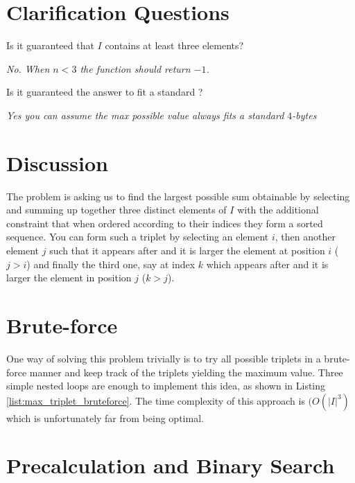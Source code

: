 \section{Clarification Questions}

\begin{QandA}
	\item  Is it guaranteed that $I$ contains at least three elements?
	\begin{answered}
		\textit{No. When $n < 3$ the function should return $-1$.}
	\end{answered}
	\item  Is it guaranteed the answer to fit a standard ?
	\begin{answered}
		\textit{Yes you can assume the max possible value always fits a standard $4$-bytes }
	\end{answered}
\end{QandA}

\section{Discussion}
\label{max_triplet:sec:discussion}
The problem is asking us to find the largest possible sum obtainable by selecting and summing up together
three distinct elements of $I$ with the additional constraint that when ordered according to their indices 
they form a sorted sequence. 
You can form such a triplet by selecting an element $i$,
then another element $j$ such that it appears after and it is larger the element at position $i$ ($j>i$)  and finally the third one, say at index $k$
which appears after and it is larger the element in position $j$ ($k>j$).

\section{Brute-force}
\label{max_triplet:sec:bruteforce}
One way of solving this problem trivially is to try all possible triplets in a brute-force manner and keep track of the triplets yielding the maximum value.
Three simple nested loops are enough to implement this idea, as shown in Listing \ref{list:max_triplet_bruteforce}. 
The time complexity of this approach is $(O(|I|^3)$ which is unfortunately far from being optimal.




\section{Precalculation and Binary Search}
